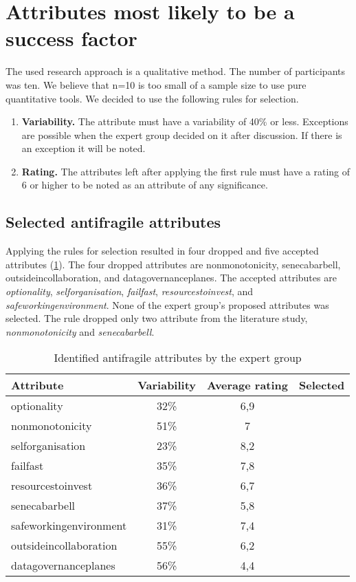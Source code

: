 \section{Attributes most likely to be a success factor}
\label{sec:expertattributessf}
The used research approach is a qualitative method. The number of participants was ten. We believe that n=10 is too small of a sample size to use pure quantitative tools. We decided to use the following rules for selection. 
\begin{enumerate}
	\item{\textbf{Variability.} The attribute must have a variability of 40\% or less. Exceptions are possible when the expert group decided on it after discussion. If there is an exception it will be noted.}
	\item{\textbf{Rating.} The attributes left after applying the first rule must have a rating of 6 or higher to be noted as an attribute of any significance.}
\end{enumerate}

\subsection{Selected antifragile attributes}
\label{sub:validationselectedafattributes}
Applying the rules for selection resulted in four dropped and five accepted \glspl{attribute} (\cref{tab:expertgrouppossiblesf}). The four dropped \glspl{attribute} are \gls{nonmonotonicity}, \gls{senecabarbell}, \gls{outsideincollaboration}, and \gls{datagovernanceplanes}. The accepted \glspl{attribute} are \textit{\gls{optionality}}, \textit{\gls{selforganisation}}, \textit{\gls{failfast}}, \textit{\gls{resourcestoinvest}}, and \textit{\gls{safeworkingenvironment}}. None of the expert group's proposed \glspl{attribute} was selected. The rule dropped only two \gls{attribute} from the literature study, \textit{\gls{nonmonotonicity}} and \textit{\gls{senecabarbell}}.
{\small\tabcolsep=3pt  %
\begin{longtable}{@{}lccc@{}}
	\toprule%
	\textbf{Attribute} & \textbf{Variability} & \textbf{Average rating} & \textbf{Selected} \\%
	\midrule%
	\endhead%
	\hline
	\endfoot%
	\caption[Identified antifragile attributes by the expert group]{Identified antifragile attributes by the expert group}
	\label{tab:expertgrouppossiblesf}
	\endlastfoot%
	\Gls{optionality} & 32\% & 6,9 & \checkmark \\%
	\Gls{nonmonotonicity} & 51\% & 7 &  \\%
	\Gls{selforganisation} & 23\% & 8,2 & \checkmark  \\%
	\Gls{failfast} & 35\% & 7,8 & \checkmark  \\%
	\Gls{resourcestoinvest} & 36\% & 6,7 & \checkmark \\%
	\Gls{senecabarbell} & 37\% & 5,8 &  \\%
	\Gls{safeworkingenvironment} & 31\% & 7,4 & \checkmark  \\%
	\Gls{outsideincollaboration} & 55\% & 6,2 &  \\%
	\Gls{datagovernanceplanes} & 56\% & 4,4 &  \\%
	\bottomrule%
\end{longtable}%
}%

